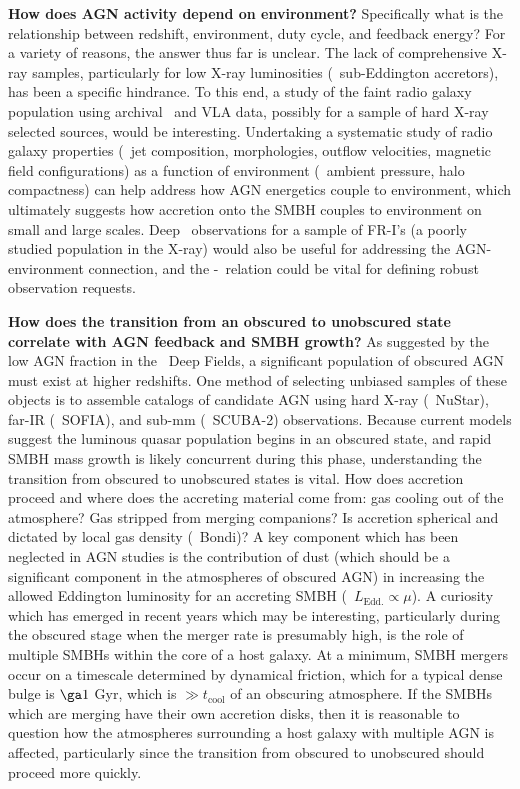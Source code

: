 \documentclass[12pt]{article}
\begin{document}
{\bf{How does AGN activity depend on environment?}} Specifically what
is the relationship between redshift, environment, duty cycle, and
feedback energy? For a variety of reasons, the answer thus far is
unclear. The lack of comprehensive X-ray samples, particularly for low
X-ray luminosities (\ie\ sub-Eddington accretors), has been a specific
hindrance. To this end, a study of the faint radio galaxy population
using archival \chandra\ and VLA data, possibly for a sample of hard
X-ray selected sources, would be interesting. Undertaking a systematic
study of radio galaxy properties (\ie\ jet composition, morphologies,
outflow velocities, magnetic field configurations) as a function of
environment (\ie\ ambient pressure, halo compactness) can help address
how AGN energetics couple to environment, which ultimately suggests
how accretion onto the SMBH couples to environment on small and large
scales. Deep \chandra\ observations for a sample of FR-I's (a poorly
studied population in the X-ray) would also be useful for addressing
the AGN-environment connection, and the \pjet-\lrad\ relation could be
vital for defining robust observation requests.

{\bf{How does the transition from an obscured to unobscured state
    correlate with AGN feedback and SMBH growth?}} As suggested by the
low AGN fraction in the \chandra\ Deep Fields, a significant
population of obscured AGN must exist at higher redshifts. One method
of selecting unbiased samples of these objects is to assemble catalogs
of candidate AGN using hard X-ray (\ie\ NuStar), far-IR (\ie\ SOFIA),
and sub-mm (\ie\ SCUBA-2) observations. Because current models suggest
the luminous quasar population begins in an obscured state, and rapid
SMBH mass growth is likely concurrent during this phase, understanding
the transition from obscured to unobscured states is vital. How does
accretion proceed and where does the accreting material come from: gas
cooling out of the atmosphere? Gas stripped from merging companions?
Is accretion spherical and dictated by local gas density (\eg\ Bondi)?
A key component which has been neglected in AGN studies is the
contribution of dust (which should be a significant component in the
atmospheres of obscured AGN) in increasing the allowed Eddington
luminosity for an accreting SMBH (\ie\ $L_{\mathrm{Edd.}} \propto
\mu$). A curiosity which has emerged in recent years which may be
interesting, particularly during the obscured stage when the merger
rate is presumably high, is the role of multiple SMBHs within the core
of a host galaxy. At a minimum, SMBH mergers occur on a timescale
determined by dynamical friction, which for a typical dense bulge is
$\ga 1$ Gyr, which is $\gg t_{\mathrm{cool}}$ of an obscuring
atmosphere. If the SMBHs which are merging have their own accretion
disks, then it is reasonable to question how the atmospheres
surrounding a host galaxy with multiple AGN is affected, particularly
since the transition from obscured to unobscured should proceed more
quickly.

\scriptsize


 
\end{document}
